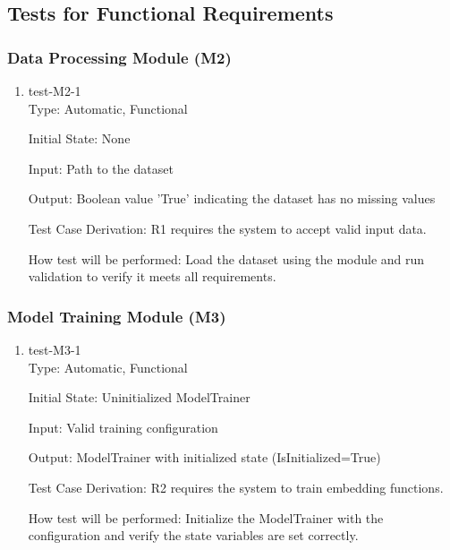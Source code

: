 \documentclass[12pt, titlepage]{article}
\begin{document}
\subsection{Tests for Functional Requirements}


\subsubsection{Data Processing Module (M2)}

\begin{enumerate}
  \item{test-M2-1\\}
  Type: Automatic, Functional
            
  Initial State: None
            
  Input: Path to the dataset
            
  Output: Boolean value 'True' indicating the dataset has no missing values
  
  Test Case Derivation: R1 requires the system to accept valid input data.
  
  How test will be performed: Load the dataset using the module and run validation to verify it meets all requirements.
  
\end{enumerate}

\subsubsection{Model Training Module (M3)}

\begin{enumerate}

\item{test-M3-1\\}
Type: Automatic, Functional
					
Initial State: Uninitialized ModelTrainer
					
Input: Valid training configuration
					
Output: ModelTrainer with initialized state (IsInitialized=True)

Test Case Derivation: R2 requires the system to train embedding functions.

How test will be performed: Initialize the ModelTrainer with the configuration and verify the state variables are set correctly.

\end{enumerate}
\end{document}
